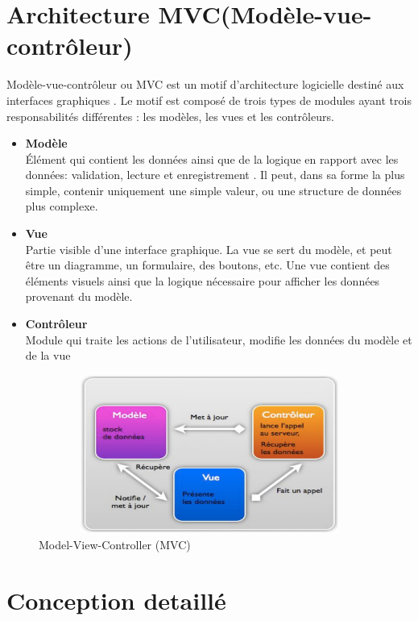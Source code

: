 \documentclass[11pt,a4paper,oneside]{book}
\begin{document}
			\section{Architecture MVC(Modèle-vue-contrôleur)}
			Modèle-vue-contrôleur ou MVC est un motif d'architecture logicielle destiné aux interfaces graphiques . Le motif est composé de trois types de modules ayant trois responsabilités différentes : les modèles, les vues et les contrôleurs.
			\begin{itemize}
				\item \textbf{Modèle} \\ Élément qui contient les données ainsi que de la logique en rapport avec les données: validation, lecture et enregistrement . Il peut, dans sa forme la plus simple, contenir uniquement une simple valeur, ou une structure de données plus complexe.
				
				\item \textbf{Vue} \\ Partie visible d'une interface graphique. La vue se sert du modèle, et peut être un diagramme, un formulaire, des boutons, etc. Une vue contient des éléments visuels ainsi que la logique nécessaire pour afficher les données provenant du modèle.
				
				\item \textbf{Contrôleur} \\ Module qui traite les actions de l'utilisateur, modifie les données du modèle et de la vue
			\end{itemize}
			\begin{figure}[H]
				\centering
				\includegraphics[width=13cm, height=5.2cm]{"Images/ch3/Capture du 2018-05-22 19-49-45"}
				\caption{Model-View-Controller (MVC)}
				\label{fig:capture-du-2018-05-22-19-49-45}
			\end{figure}
			
			\section{Conception detaillé }
\end{document}
